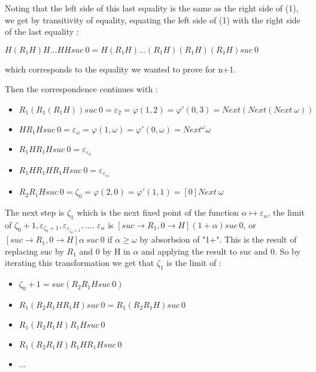 \documentclass[10pt]{article}
\begin{document}
Noting that the left side of this last equality is the same as the right side of (1), we get by transitivity of equality, equating the left side of (1) with the right side of the last equality :

\( H (R_1 H) H \ldots H H suc\ 0 = H (R_1 H) \ldots (R_1 H) (R_1 H) (R_1 H) suc\ 0  \)

which corresponds to the equality we wanted to prove for n+1.

\bigskip

Then the correspondence continues with :

\begin{itemize}
     \setlength{\itemsep}{1pt}
     \setlength{\parskip}{0pt}
     \setlength{\parsep}{0pt}

\item \( R_1 (R_1 (R_1 H)) suc\ 0 = \varepsilon_2 = \varphi(1,2) = \varphi'(0,3) = Next (Next (Next\ \omega)) \)
\item \( H R_1 H suc\ 0 = \varepsilon_\omega = \varphi(1,\omega) = \varphi'(0,\omega) = Next^\omega \omega \)
\item \( R_1 H R_1 H suc\ 0 = \varepsilon_{\varepsilon_0} \)
\item \( R_1 H R_1 H R_1 H suc\ 0 = \varepsilon_{\varepsilon_{\varepsilon_0}} \)
\item \( R_2 R_1 H suc\ 0 = \zeta_0 = \varphi(2,0) = \varphi'(1,1) = [0] Next\ \omega \)

\end{itemize}

The next step is \( \zeta_1 \) which is the next fixed point of the function \( \alpha \mapsto \varepsilon_\alpha \), the limit of \( \zeta_0+1, \varepsilon_{\zeta_0+1}, \varepsilon_{\varepsilon_{\zeta_0+1}}, \ldots \). \( \varepsilon_\alpha \) is \( [suc \rightarrow R_1, 0 \rightarrow H] (1+\alpha) suc\ 0 \), or \( [suc \rightarrow R_1, 0 \rightarrow H] \alpha\ suc\ 0 \) if \( \alpha \geq \omega \) by absorbsion of "1+". This is the result of replacing suc by \( R_1 \) and 0 by H in \( \alpha \) and applying the result to suc and 0. So by iterating this transformation we get that \( \zeta_1 \) is the limit of :

\begin{itemize}
     \setlength{\itemsep}{1pt}
     \setlength{\parskip}{0pt}
     \setlength{\parsep}{0pt}
\item \( \zeta_0+1 = suc (R_2 R_1 H suc\ 0) \)
\item \( R_1 (R_2 R_1 H R_1 H) suc\ 0 = R_1 (R_2 R_1 H) suc\ 0 \)
\item \( R_1 (R_2 R_1 H) R_1 H suc\ 0 \)
\item \( R_1 (R_2 R_1 H) R_1 H R_1 H suc\ 0 \)
\item \( \ldots \)
\end{itemize}
\end{document}
